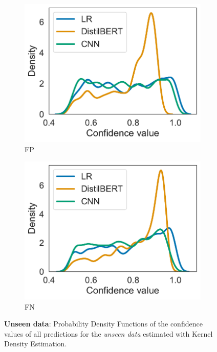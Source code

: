 \begin{figure}[H]
\begin{subfigure}{.35\textwidth}
        \centering
        \includegraphics[scale=.40]{Figures/confidence-densities-unseen-fp.pdf}
        \caption{FP}
    \end{subfigure}
    \begin{subfigure}{.35\textwidth}
        \centering
        \includegraphics[scale=.40]{Figures/confidence-densities-unseen-fn.pdf}
        \caption{FN}
    \end{subfigure}
    \caption{\textbf{Unseen data}: Probability Density Functions of the confidence values of all predictions for the \emph{unseen data} estimated with Kernel Density Estimation.}
    \label{fig:pdfs-unseen}
\end{figure}